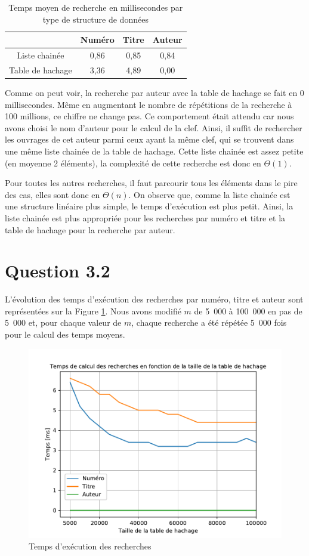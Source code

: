 \documentclass[a4paper,12pt]{article}
\numberwithin{equation}{section}
\begin{document}
\begin{table}[ht]
\centering
\begin{tabular}{c|ccc}
\hline\hline
& Numéro & Titre & Auteur \tabularnewline
\hline
Liste chainée & 0,86 & 0,85 & 0,84 \tabularnewline
Table de hachage & 3,36 & 4,89 & 0,00 \tabularnewline
\hline\hline
\end{tabular}
\caption{Temps moyen de recherche en millisecondes par type de structure de données}
\label{TabQues31}
\end{table}

Comme on peut voir, la recherche par auteur avec la table de hachage se fait en 0 millisecondes. Même en augmentant le nombre de répétitions de la recherche à 100 millions, ce chiffre ne change pas. Ce comportement était attendu car nous avons choisi le nom d'auteur pour le calcul de la clef. Ainsi, il suffit de rechercher les ouvrages de cet auteur parmi ceux ayant la même clef, qui se trouvent dans une même liste chainée de la table de hachage. Cette liste chainée est assez petite (en moyenne 2 éléments), la complexité de cette recherche est donc en $\Theta(1)$.

Pour toutes les autres recherches, il faut parcourir tous les éléments dans le pire des cas, elles sont donc en $\Theta(n)$. On observe que, comme la liste chainée est une structure linéaire plus simple, le temps d'exécution est plus petit. Ainsi, la liste chainée est plus appropriée pour les recherches par numéro et titre et la table de hachage pour la recherche par auteur.

\section*{Question 3.2}

L'évolution des temps d'exécution des recherches par numéro, titre et auteur sont représentées sur la Figure \ref{FigQues32}. Nous avons modifié $m$ de 5~000 à 100~000 en pas de 5~000 et, pour chaque valeur de $m$, chaque recherche a été répétée 5~000 fois pour le calcul des temps moyens.

\begin{figure}[ht]
\centering
\includegraphics[scale=0.75]{FigQues3_2}
\caption{Temps d'exécution des recherches}
\label{FigQues32}
\end{figure}
\end{document}
